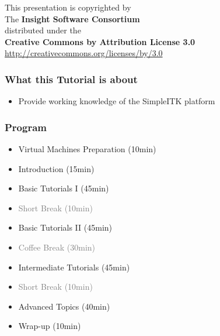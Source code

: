{
\begin{frame}[plain]
\center
\begin{center}
This presentation is copyrighted by\\
The \textbf{Insight Software Consortium}\\
\bigskip
distributed under the\\
\textbf{Creative Commons by Attribution License 3.0}\\
\url{http://creativecommons.org/licenses/by/3.0}\\
\end{center}
\end{frame}
}


\begin{frame}
\frametitle{What this Tutorial is about}
\begin{itemize}
\item Provide working knowledge of the SimpleITK platform
\end{itemize}
\end{frame}

\begin{frame}
\frametitle{Program}

\begin{itemize}
\item Virtual Machines Preparation (10min)
\item Introduction (15min)
\item Basic Tutorials I (45min)
\item \textcolor{gray}{Short Break (10min)}
\item Basic Tutorials II (45min)
\item \textcolor{gray}{Coffee Break (30min)}
\item Intermediate Tutorials (45min)
\item \textcolor{gray}{Short Break (10min)}
\item Advanced Topics (40min)
\item Wrap-up (10min)
\end{itemize}

\end{frame}
